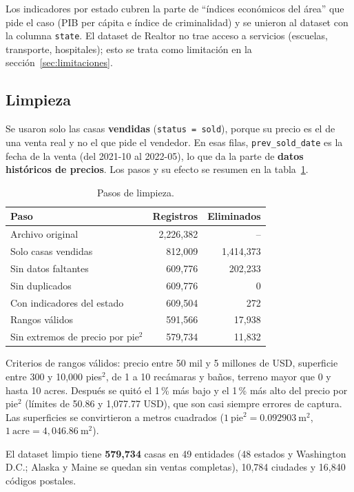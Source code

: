 \documentclass[12pt,letterpaper]{article}
\begin{document}
Los indicadores por estado cubren la parte de ``índices económicos del área'' que pide el caso (PIB per cápita e índice de criminalidad) y se unieron al dataset con la columna \texttt{state}. El dataset de Realtor no trae acceso a servicios (escuelas, transporte, hospitales); esto se trata como limitación en la sección~\ref{sec:limitaciones}.

\subsection{Limpieza}

Se usaron solo las casas \textbf{vendidas} (\texttt{status = sold}), porque su precio es el de una venta real y no el que pide el vendedor. En esas filas, \texttt{prev\_sold\_date} es la fecha de la venta (del 2021-10 al 2022-05), lo que da la parte de \textbf{datos históricos de precios}. Los pasos y su efecto se resumen en la tabla~\ref{tab:limpieza}.

\begin{table}[H]
\centering
\caption{Pasos de limpieza.}\label{tab:limpieza}
\small
\begin{tabular}{lrr}
\toprule
Paso & Registros & Eliminados \\
\midrule
Archivo original & 2,226,382 & -- \\
Solo casas vendidas & 812,009 & 1,414,373 \\
Sin datos faltantes & 609,776 & 202,233 \\
Sin duplicados & 609,776 & 0 \\
Con indicadores del estado & 609,504 & 272 \\
Rangos válidos & 591,566 & 17,938 \\
Sin extremos de precio por pie$^2$ & 579,734 & 11,832 \\
\bottomrule
\end{tabular}
\end{table}

Criterios de rangos válidos: precio entre 50 mil y 5 millones de USD, superficie entre 300 y 10,000 pies$^2$, de 1 a 10 recámaras y baños, terreno mayor que 0 y hasta 10 acres. Después se quitó el 1\,\% más bajo y el 1\,\% más alto del precio por pie$^2$ (límites de 50.86 y 1,077.77 USD), que son casi siempre errores de captura. Las superficies se convirtieron a metros cuadrados ($1\ \text{pie}^2 = 0.092903\ \text{m}^2$, $1\ \text{acre} = 4{,}046.86\ \text{m}^2$).

El dataset limpio tiene \textbf{579,734} casas en 49 entidades (48 estados y Washington D.C.; Alaska y Maine se quedan sin ventas completas), 10,784 ciudades y 16,840 códigos postales.
\end{document}
